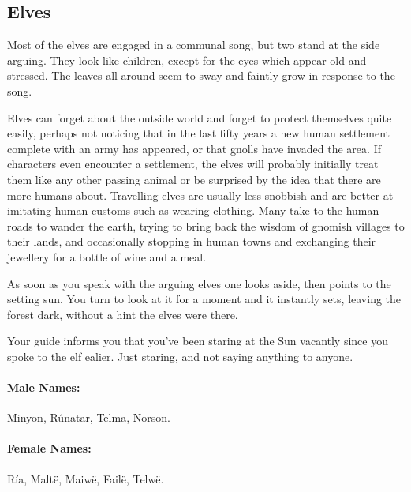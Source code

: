 \begin{multicols}{2}
\subsection{Elves}

\begin{boxtext}

  Most of the elves are engaged in a communal song, but two stand at the side arguing.
  They look like children, except for the eyes which appear old and stressed.
  The leaves all around seem to sway and faintly grow in response to the song.

\end{boxtext}

Elves can forget about the outside world and forget to protect themselves quite easily, perhaps not noticing that in the last fifty years a new human settlement complete with an army has appeared, or that gnolls have invaded the area.
If characters even encounter a settlement, the elves will probably initially treat them like any other passing animal or be surprised by the idea that there are more humans about.
Travelling elves are usually less snobbish and are better at imitating human customs such as wearing clothing.
Many take to the human roads to wander the earth, trying to bring back the wisdom of gnomish villages to their lands, and occasionally stopping in human towns and exchanging their jewellery for a bottle of wine and a meal.

\begin{boxtext}

  As soon as you speak with the arguing elves one looks aside, then points to the setting sun.
  You turn to look at it for a moment and it instantly sets, leaving the forest dark, without a hint the elves were there.

  Your guide informs you that you've been staring at the Sun vacantly since you spoke to the elf ealier.
  Just staring, and not saying anything to anyone.

\end{boxtext}

\paragraph{Male Names:} Minyon, R\'{u}natar, Telma, Norson.
\paragraph{Female Names:} R\'{i}a, Malt\"{e}, Maiw\"{e}, Fail\"{e}, Telw\"{e}.


\end{multicols}
